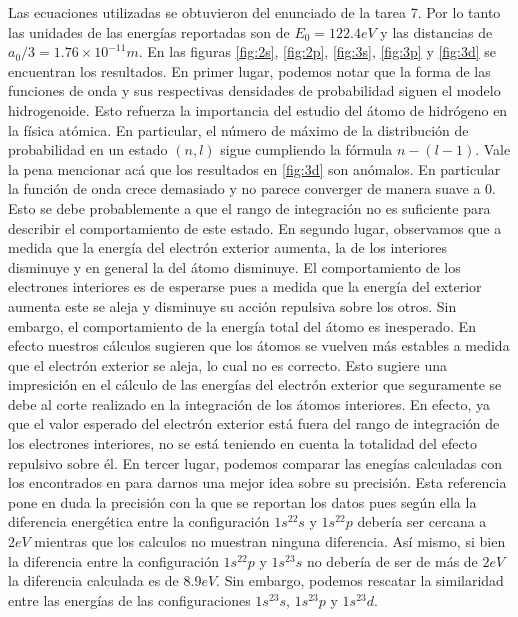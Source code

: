 \documentclass[a4paper]{article}
\begin{document}
Las ecuaciones utilizadas se obtuvieron del enunciado de la tarea 7. Por lo tanto las unidades de las energías reportadas son de $E_0 = 122.4eV$ y las distancias de $a_0/3=1.76\times 10 ^{-11}m$. En las figuras \ref{fig:2s}, \ref{fig:2p}, \ref{fig:3s}, \ref{fig:3p} y \ref{fig:3d} se encuentran los resultados. En primer lugar, podemos notar que la forma de las funciones de onda y sus respectivas densidades de probabilidad siguen el modelo hidrogenoide. Esto refuerza la importancia del estudio del átomo de hidrógeno en la física atómica. En particular, el número de máximo de la distribución de probabilidad en un estado $(n,l)$ sigue cumpliendo la fórmula $n - (l-1)$. Vale la pena mencionar acá que los resultados en \ref{fig:3d} son anómalos. En particular la función de onda crece demasiado y no parece converger de manera suave a $0$. Esto se debe probablemente a que el rango de integración no es suficiente para describir el comportamiento de este estado. En segundo lugar, observamos que a medida que la energía del electrón exterior aumenta, la de los interiores disminuye y en general la del átomo disminuye. El comportamiento de los electrones interiores es de esperarse pues a medida que la energía del exterior aumenta este se aleja y disminuye su acción repulsiva sobre los otros. Sin embargo, el comportamiento de la energía total del átomo es inesperado. En efecto nuestros cálculos sugieren que los átomos se vuelven más estables a medida que el electrón exterior se aleja, lo cual no es correcto. Esto sugiere una impresición en el cálculo de las energías del electrón exterior que seguramente se debe al corte realizado en la integración de los átomos interiores. En efecto, ya que el valor esperado del electrón exterior está fuera del rango de integración de los electrones interiores, no se está teniendo en cuenta la totalidad del efecto repulsivo sobre él. En tercer lugar, podemos comparar las enegías calculadas con los encontrados en \cite{nist} para darnos una mejor idea sobre su precisión. Esta referencia pone en duda la precisión con la que se reportan los datos pues según ella la diferencia energética entre la configuración $1s^22s$ y $1s^22p$ debería ser cercana a $2eV$ mientras que los calculos no muestran ninguna diferencia. Así mismo, si bien la diferencia entre la configuración $1s^22p$ y $1s^23s$ no debería de ser de más de $2eV$ la diferencia calculada es de $8.9eV$. Sin embargo, podemos rescatar la similaridad entre las energías de las configuraciones $1s^23s$, $1s^23p$ y $1s^23d$.
\end{document}
